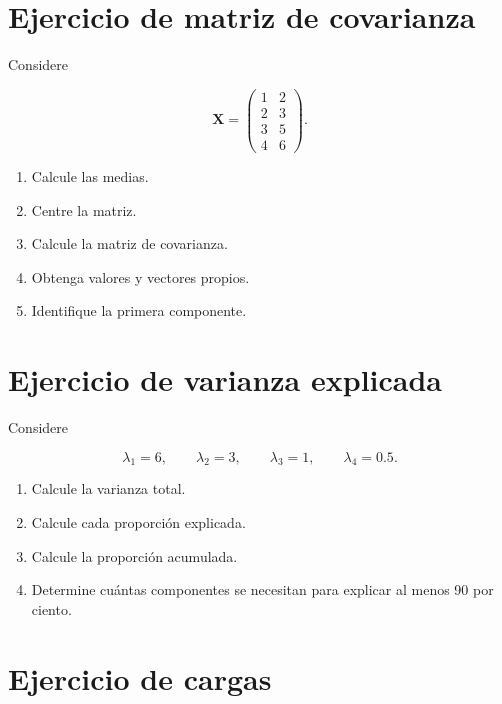 \documentclass[
  spanish,
  10.5pt,
  letterpaper,
  DIV=11,
  numbers=noendperiod,
  oneside,
  open=any]{scrreprt}
\providecommand{\tightlist}{%
  \setlength{\itemsep}{0pt}\setlength{\parskip}{0pt}}
\theoremstyle{definition}
\theoremstyle{definition}
\theoremstyle{plain}
\theoremstyle{remark}
\begin{document}
\section*{Ejercicio de matriz de
covarianza}\label{ejercicio-de-matriz-de-covarianza}


Considere

\[
\mathbf{X}
=
\begin{pmatrix}
1 & 2\\
2 & 3\\
3 & 5\\
4 & 6
\end{pmatrix}.
\]

\begin{enumerate}
\def\labelenumi{\arabic{enumi}.}
\tightlist
\item
  Calcule las medias.
\item
  Centre la matriz.
\item
  Calcule la matriz de covarianza.
\item
  Obtenga valores y vectores propios.
\item
  Identifique la primera componente.
\end{enumerate}

\section*{Ejercicio de varianza
explicada}\label{ejercicio-de-varianza-explicada}


Considere

\[
\lambda_1=6,
\qquad
\lambda_2=3,
\qquad
\lambda_3=1,
\qquad
\lambda_4=0.5.
\]

\begin{enumerate}
\def\labelenumi{\arabic{enumi}.}
\tightlist
\item
  Calcule la varianza total.
\item
  Calcule cada proporción explicada.
\item
  Calcule la proporción acumulada.
\item
  Determine cuántas componentes se necesitan para explicar al menos 90
  por ciento.
\end{enumerate}

\section*{Ejercicio de cargas}\label{ejercicio-de-cargas}
\end{document}
